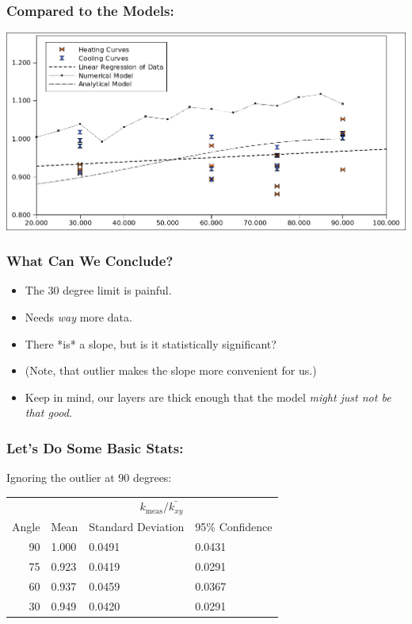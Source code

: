 \documentclass{beamer}
\begin{document}
\begin{frame}
\frametitle{Compared to the Models:}
\includegraphics[width=\textwidth]{fig/test_results.png}
\end{frame}


\begin{frame}
\frametitle{What Can We Conclude?}
\begin{itemize}
\item The 30 degree limit is painful.
\item Needs \emph{way} more data.
\item There *is* a slope, but is it statistically significant?
\item (Note, that outlier makes the slope more convenient for us.)
\item Keep in mind, our layers are thick enough that the model \emph{might just not be that good}.
\end{itemize}
\end{frame}


\begin{frame}
\frametitle{Let's Do Some Basic Stats:}
Ignoring the outlier at \(90\) degrees:
\begin{table}
\begin{tabular}{r | l l l}
 & \multicolumn{3}{c}{ \(k_{\textrm{meas}} / \bar{k_{xy}}\) }\\
Angle & Mean & Standard Deviation & 95\% Confidence\\
90 & 1.000 & 0.0491 & 0.0431\\
75 & 0.923 & 0.0419 & 0.0291\\
60 & 0.937 & 0.0459 & 0.0367\\
30 & 0.949 & 0.0420 & 0.0291\\
\end{tabular}
\end{table}
\end{frame}
\end{document}
